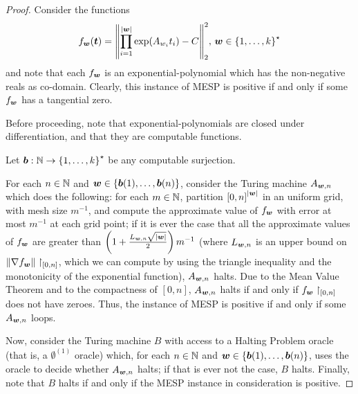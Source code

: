 \begin{proof}
Consider the functions
\begin{equation*}
    f_{\boldsymbol{w}}(\boldsymbol{t}) = {\left \| \prod \limits_{i=1}^{\lvert \boldsymbol{w} \rvert} \exp(A_{w_{i}} t_{i}) - C \right \|}_{2}^{2}, \, \boldsymbol{w} \in {\lbrace 1, \ldots, k \rbrace}^{\star}
\end{equation*}
and note that each $f_{\boldsymbol{w}}$ is an exponential-polynomial which has the non-negative reals as co-domain. Clearly, this instance of MESP is positive if and only if some $f_{\boldsymbol{w}}$ has a tangential zero.

Before proceeding, note that exponential-polynomials are closed under differentiation, and that they are computable functions.

Let $\boldsymbol{b} : \mathbb{N} \rightarrow {\lbrace 1, \ldots, k \rbrace}^{\star}$ be any computable surjection.

For each $n \in \mathbb{N}$ and $\boldsymbol{w} \in \lbrace \boldsymbol{b}(1), \ldots, \boldsymbol{b}(n) \rbrace$, consider the Turing machine $A_{\boldsymbol{w}, n}$ which does the following:
for each $m \in \mathbb{N}$, partition ${[0,n]}^{\lvert \boldsymbol{w} \rvert}$ in an uniform grid, with mesh size $m^{-1}$, and compute the approximate value of $f_{\boldsymbol{w}}$ with error at most $m^{-1}$ at each grid point;
if it is ever the case that all the approximate values of $f_{\boldsymbol{w}}$ are greater than $\left(1+ \frac{L_{\boldsymbol{w}, n}\sqrt{\lvert \boldsymbol{w} \rvert}}{2} \right) m^{-1}$ (where $L_{\boldsymbol{w}, n}$ is an upper bound on ${\| \nabla f_{\boldsymbol{w}} \|}\restriction_{[0,n]}$, which we can compute by using the triangle inequality and the monotonicity of the exponential function), $A_{\boldsymbol{w}, n}$ halts.
Due to the Mean Value Theorem and to the compactness of $[0,n]$, $A_{\boldsymbol{w}, n}$ halts if and only if $f_{\boldsymbol{w}} \restriction_{[0,n]}$ does not have zeroes.
Thus, the instance of MESP is positive if and only if some $A_{\boldsymbol{w}, n}$ loops.

Now, consider the Turing machine $B$ with access to a Halting Problem oracle (that is, a $\emptyset^{(1)}$ oracle) which, for each $n \in \mathbb{N}$ and $\boldsymbol{w} \in \lbrace \boldsymbol{b}(1), \ldots, \boldsymbol{b}(n) \rbrace$, uses the oracle to decide whether $A_{\boldsymbol{w}, n}$ halts; if that is ever not the case, $B$ halts. Finally, note that $B$ halts if and only if the MESP instance in consideration is positive.
\end{proof}

